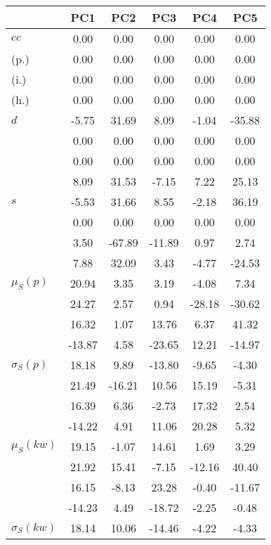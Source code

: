 \begin{table}[h!]
\begin{center}
\begin{tabular}{| l | c | c | c | c | c |}\hline
 & PC1 & PC2 & PC3 & PC4 & PC5 \\\hline
$cc$ & 0.00  & 0.00  & 0.00  & 0.00  & 0.00 \\\hline
(p.) & 0.00  & 0.00  & 0.00  & 0.00  & 0.00 \\\hline
(i.) & 0.00  & 0.00  & 0.00  & 0.00  & 0.00 \\\hline
(h.) & 0.00  & 0.00  & 0.00  & 0.00  & 0.00 \\\hline
$d$ & -5.75  & 31.69  & 8.09  & -1.04  & -35.88 \\\hline
 & 0.00  & 0.00  & 0.00  & 0.00  & 0.00 \\\hline
 & 0.00  & 0.00  & 0.00  & 0.00  & 0.00 \\\hline
 & 8.09  & 31.53  & -7.15  & 7.22  & 25.13 \\\hline
$s$ & -5.53  & 31.66  & 8.55  & -2.18  & 36.19 \\\hline
 & 0.00  & 0.00  & 0.00  & 0.00  & 0.00 \\\hline
 & 3.50  & -67.89  & -11.89  & 0.97  & 2.74 \\\hline
 & 7.88  & 32.09  & 3.43  & -4.77  & -24.53 \\\hline
$\mu_S(p)$ & 20.94  & 3.35  & 3.19  & -4.08  & 7.34 \\\hline
 & 24.27  & 2.57  & 0.94  & -28.18  & -30.62 \\\hline
 & 16.32  & 1.07  & 13.76  & 6.37  & 41.32 \\\hline
 & -13.87  & 4.58  & -23.65  & 12.21  & -14.97 \\\hline
$\sigma_S(p)$ & 18.18  & 9.89  & -13.80  & -9.65  & -4.30 \\\hline
 & 21.49  & -16.21  & 10.56  & 15.19  & -5.31 \\\hline
 & 16.39  & 6.36  & -2.73  & 17.32  & 2.54 \\\hline
 & -14.22  & 4.91  & 11.06  & 20.28  & 5.32 \\\hline
$\mu_S(kw)$ & 19.15  & -1.07  & 14.61  & 1.69  & 3.29 \\\hline
 & 21.92  & 15.41  & -7.15  & -12.16  & 40.40 \\\hline
 & 16.15  & -8.13  & 23.28  & -0.40  & -11.67 \\\hline
 & -14.23  & 4.49  & -18.72  & -2.25  & -0.48 \\\hline
$\sigma_S(kw)$ & 18.14  & 10.06  & -14.46  & -4.22  & -4.33 \\\hline

\end{tabular}
\end{center}
\end{table}
